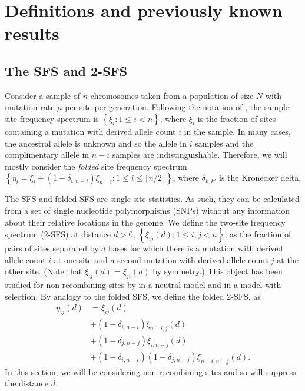 \documentclass[11pt, letterpaper]{article}   	%
\newcommand{\floor}[1]{\lfloor #1 \rfloor}
\begin{document}
\section*{Definitions and previously known results}

\subsection*{The SFS and 2-SFS}
Consider a sample of $n$ chromosomes taken from a population of size $N$ with mutation rate $\mu$ per site per generation.
Following the notation of \cite{Fu1995}, the sample site frequency spectrum is $\left\{ \xi_i : 1 \leq i < n \right\}$, where $\xi_i$ is the fraction of sites containing a mutation with derived allele count $i$ in the sample.
In many cases, the ancestral allele is unknown and so the allele in $i$ samples and the complimentary allele in $n-i$ samples are indistinguishable.
Therefore, we will mostly consider the \textit{folded} site frequency spectrum $\left\{ \eta_i = \xi_i + (1-\delta_{i,n-i}) \xi_{n-i}: 1 \leq i \leq \floor{n/2} \right\}$, where $\delta_{k,k'}$ is the Kronecker delta. %

The SFS and folded SFS are single-site statistics.
As such, they can be calculated from a set of single nucleotide polymorphisms (SNPs) without any information about their relative locations in the genome.
We define the two-site frequency spectrum (2-SFS) at distance $d > 0$,
$\left\{ \xi_{ij}(d) : 1 \leq i, j < n\right\}$,
as the fraction of pairs of sites separated by $d$ bases for which there is a mutation with derived allele count $i$ at one site and a second mutation with derived allele count $j$ at the other site.
(Note that $\xi_{ij}(d) = \xi_{ji}(d)$ by symmetry.)
This object has been studied for non-recombining sites by \cite{FerrettiEtAl2018} in a neutral model and \cite{Xie2011} in a model with selection.
By analogy to the folded SFS, we define the folded 2-SFS, as
\begin{align*}
    \eta_{ij}(d) &= \xi_{ij}(d) \\
                 &+ (1-\delta_{i,n-i}) \xi_{n-i,j}(d) \\
                 &+ (1-\delta_{j,n-j}) \xi_{i,n-j}(d) \\
                 &+ (1-\delta_{i,n-i}) (1-\delta_{j,n-j}) \xi_{n-i,n-j}(d).
\end{align*}
In this section, we will be considering non-recombining sites and so will suppress the distance $d$.
\end{document}
